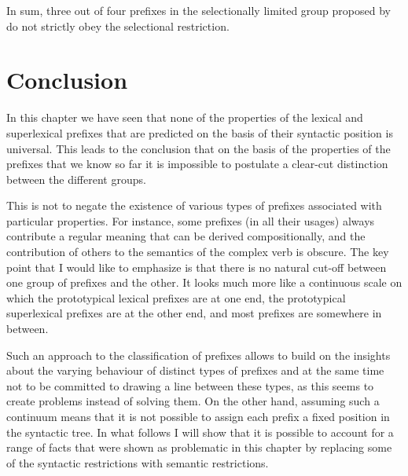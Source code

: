 In sum, three out of four prefixes in the selectionally limited group proposed by \citet{Tatevosov:09} do not strictly obey the selectional restriction. 

\section{Conclusion}\label{section:new:conclusion}
In this chapter we have seen that none of the properties of the lexical and superlexical prefixes that are predicted on the basis of their syntactic position is universal. This leads to the conclusion that on the basis of the properties of the prefixes that we know so far it is impossible to postulate a clear-cut distinction between the different groups. 

This is not to negate the existence of various types of prefixes associated with particular properties. For instance, some prefixes (in all their usages) always contribute a regular meaning that can be derived compositionally, and the contribution of others to the semantics of the complex verb is obscure. The key point that I would like to emphasize is that there is no natural cut-off between one group of prefixes and the other. It looks much more like a continuous scale on which the prototypical lexical prefixes are at one end, the prototypical superlexical prefixes are at the other end, and most prefixes are somewhere in between. 

Such an approach to the classification of prefixes allows to build on the insights about the varying behaviour of distinct types of prefixes and at the same time not to be committed to drawing a line between these types, as this seems to create problems instead of solving them. On the other hand, assuming such a continuum means that it is not possible to assign each prefix a fixed position in the syntactic tree. In what follows I will show that it is possible to account for a range of facts that were shown as problematic in this chapter by replacing some of the syntactic restrictions with semantic restrictions.
